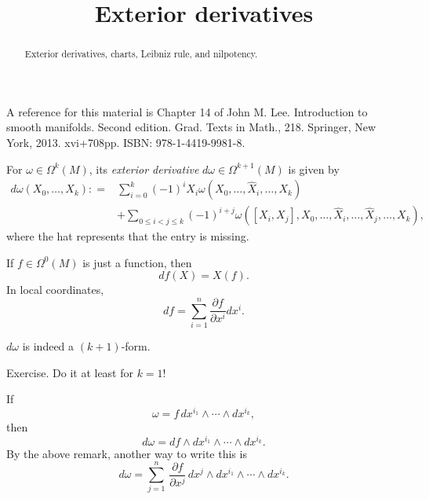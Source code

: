 \documentclass{ximera}
\title{Exterior derivatives}
\begin{document}
    \begin{abstract} Exterior derivatives, charts,  Leibniz rule, and nilpotency.  \end{abstract}
    \maketitle

        A reference for this material is Chapter 14 of John M. Lee. Introduction to smooth manifolds. Second edition. Grad. Texts in Math., 218. Springer, New York, 2013. xvi+708pp. ISBN: 978-1-4419-9981-8.

    \begin{definition}
        For $\omega \in \Omega ^k (M)$, its \emph{exterior derivative} $d\omega \in \Omega ^{k + 1} (M)$ is given by
        \begin{align*}
            d\omega (X_0, \ldots , X_k) : = & \sum _{i = 0} ^k  (-1) ^i   X_i \omega (X_0, \ldots , \hat{X}_i , \ldots , X_k) \\
            & + \sum_{0\leq i < j \leq k} (-1) ^{i + j} \omega ( [X_i, X_j], X_0, \ldots , \hat{X}_i, \ldots , \hat{X}_j , \ldots , X_k  ),
        \end{align*}
        where the hat represents that the entry is missing. 
    \end{definition}

\begin{remark}
    If $f \in \Omega ^0 (M)$ is just a function, then 
    \[    d f (X) = X (f) .          \]
    In local coordinates, 
    \[     d f = \sum_{i = 1} ^n \frac{\partial f}{\partial x^i} dx ^i .       \]
\end{remark}
    


    \begin{proposition} 
        $d\omega$ is indeed a  $(k+1 )$-form. 
    \end{proposition}

    \begin{solution}
        Exercise. Do it at least for $k =1$!
    \end{solution}


    \begin{proposition}
        If 
        \[   \omega = f \, dx^{i_1} \wedge \cdots \wedge dx^{i_k}    ,        \]
        then
        \[             d\omega =  df \wedge  dx^{i_1} \wedge \cdots \wedge dx^{i_k}   .                \]
        By the above remark, another way to write this is 
        \[   d\omega =  \sum _{j = 1 }^n \,\frac{\partial f }{\partial x ^j }\, dx^j \wedge  dx^{i_1} \wedge \cdots \wedge dx^{i_k}   .           \]
    \end{proposition}
\end{document}
